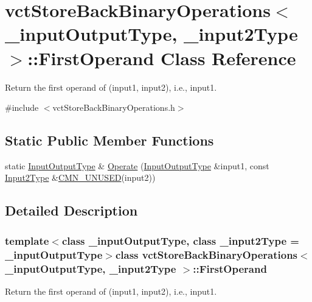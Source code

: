 \hypertarget{classvct_store_back_binary_operations_1_1_first_operand}{\section{vct\-Store\-Back\-Binary\-Operations$<$ \-\_\-input\-Output\-Type, \-\_\-input2\-Type $>$\-:\-:First\-Operand Class Reference}
\label{classvct_store_back_binary_operations_1_1_first_operand}
}


Return the first operand of (input1, input2), i.\-e., input1.  




{\ttfamily \#include $<$vct\-Store\-Back\-Binary\-Operations.\-h$>$}

\subsection*{Static Public Member Functions}
\begin{DoxyCompactItemize}
\item 
static \hyperlink{classvct_store_back_binary_operations_a9dc481d9e1345541dd5d833d5e5688f3}{Input\-Output\-Type} \& \hyperlink{classvct_store_back_binary_operations_1_1_first_operand_abf06311ce7af31c4add9fcf5dafd72ca}{Operate} (\hyperlink{classvct_store_back_binary_operations_a9dc481d9e1345541dd5d833d5e5688f3}{Input\-Output\-Type} \&input1, const \hyperlink{classvct_store_back_binary_operations_a65a7197563c794a879fb50a406e70c8f}{Input2\-Type} \&\hyperlink{cmn_portability_8h_a021894e2626935fa2305434b1e893ff6}{C\-M\-N\-\_\-\-U\-N\-U\-S\-E\-D}(input2))
\end{DoxyCompactItemize}


\subsection{Detailed Description}
\subsubsection*{template$<$class \-\_\-input\-Output\-Type, class \-\_\-input2\-Type = \-\_\-input\-Output\-Type$>$class vct\-Store\-Back\-Binary\-Operations$<$ \-\_\-input\-Output\-Type, \-\_\-input2\-Type $>$\-::\-First\-Operand}

Return the first operand of (input1, input2), i.\-e., input1. 

